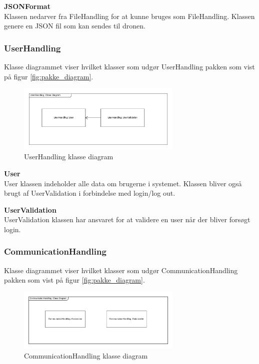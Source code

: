 \textbf{JSONFormat}\\
Klassen nedarver fra FileHandling for at kunne bruges som FileHandling. Klassen genere en JSON fil som kan sendes til dronen.

\newpage
\subsubsection*{UserHandling}
Klasse diagrammet viser hvilket klasser som udgør UserHandling pakken som vist på figur \ref{fig:pakke_diagram}.

\vspace{-5pt}
\begin{figure}[H]
	\centering
	\includegraphics[width=0.7\textwidth]{Billeder/klasse_diagrammer/UserHandlingDiagram.png}
	\vspace{-5pt}
	\caption{UserHandling klasse diagram}
	\label{fig:UserHandling_klasse_diagram}
\end{figure}

\textbf{User}\\
User klassen indeholder alle data om brugerne i systemet. Klassen bliver også brugt af UserValidation i forbindelse med login/log out.

\textbf{UserValidation}\\
UserValidation klassen har ansvaret for at validere en user når der bliver forsøgt login.\\


\subsubsection*{CommunicationHandling}
Klasse diagrammet viser hvilket klasser som udgør CommunicationHandling pakken som vist på figur \ref{fig:pakke_diagram}.

\vspace{-5pt}
\begin{figure}[H]
	\centering
	\includegraphics[width=0.7\textwidth]{Billeder/klasse_diagrammer/CommunicationHandling.png}
	\vspace{-5pt}
	\caption{CommunicationHandling klasse diagram}
	\label{fig:CommunicationHandling_klasse_diagram}
\end{figure}

